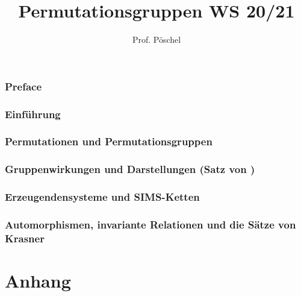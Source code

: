 \documentclass[ngerman,a4paper,order=firstname]{mathscript}
\title{\textbf{Permutationsgruppen WS 20/21}}
\author{Prof. Pöschel}
\begin{document}
\pagestyle{plain}

\maketitle

\hypertarget{tocpage}{}
\tableofcontents
{}

\pagebreak
{}
\pagestyle{fancy}

\section*{Preface}

\setcounter{section}{-1}
\section{Einführung}

\section{Permutationen und Permutationsgruppen}

\section{Gruppenwirkungen und Darstellungen (Satz von )}

\section{Erzeugendensysteme und SIMS-Ketten}

\section{Automorphismen, invariante Relationen und die Sätze von Krasner}


\part*{Anhang}
\appendix

\nocite{*}
%
%


\printindex
\end{document}
